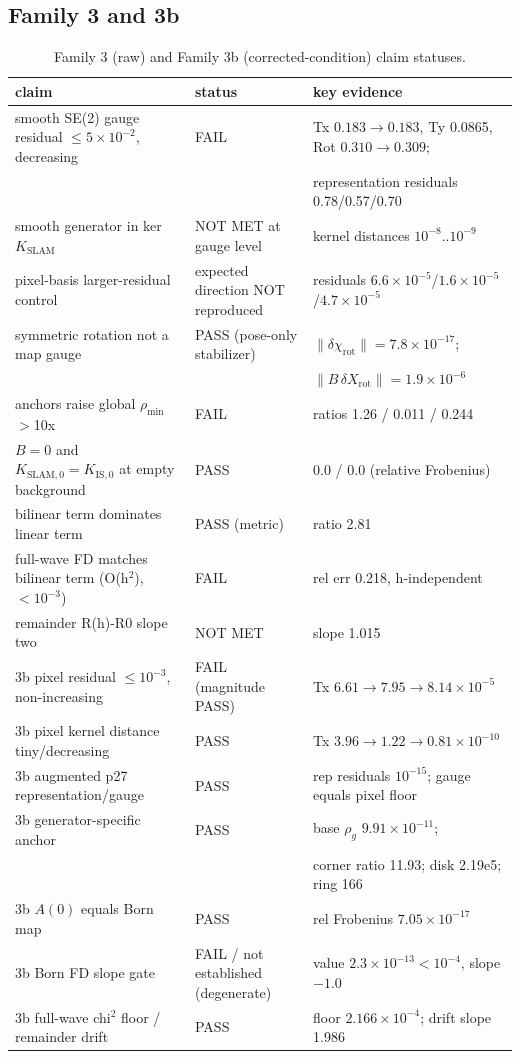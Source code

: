 \documentclass[12pt]{article}
\begin{document}
\subsection{Family 3 and 3b}
\begin{table}[ht]
\centering
\small
\caption{Family 3 (raw) and Family 3b (corrected-condition) claim statuses.}
\label{app:tab:f3}
\begin{tabular}{p{} p{} p{}}
\toprule
claim & status & key evidence \\
\midrule
smooth SE(2) gauge residual $\le5\times10^{-2}$, decreasing & FAIL &
Tx $0.183\to0.183$, Ty 0.0865, Rot $0.310\to0.309$; \\
 & & representation residuals 0.78/0.57/0.70 \\
smooth generator in ker $K_{\mathrm{SLAM}}$ & NOT MET at gauge level &
kernel distances $10^{-8}$..$10^{-9}$ \\
pixel-basis larger-residual control & expected direction NOT reproduced &
residuals $6.6\times10^{-5}$/$1.6\times10^{-5}$/$4.7\times10^{-5}$ \\
symmetric rotation not a map gauge & PASS (pose-only stabilizer) &
$\|\delta\chi_{\mathrm{rot}}\|=7.8\times10^{-17}$; \\
 & & $\|B\,\delta X_{\mathrm{rot}}\|=1.9\times10^{-6}$ \\
anchors raise global $\rho_{\min}$ $>$10x & FAIL &
ratios 1.26 / 0.011 / 0.244 \\
$B=0$ and $K_{\mathrm{SLAM},0}=K_{\mathrm{IS},0}$ at empty background &
PASS & 0.0 / 0.0 (relative Frobenius) \\
bilinear term dominates linear term & PASS (metric) & ratio 2.81 \\
full-wave FD matches bilinear term (O(h$^2$), $<10^{-3}$) & FAIL &
rel err 0.218, h-independent \\
remainder R(h)-R0 slope two & NOT MET & slope 1.015 \\
3b pixel residual $\le10^{-3}$, non-increasing & FAIL (magnitude PASS) &
Tx $6.61\to7.95\to8.14\times10^{-5}$ \\
3b pixel kernel distance tiny/decreasing & PASS &
Tx $3.96\to1.22\to0.81\times10^{-10}$ \\
3b augmented p27 representation/gauge & PASS &
rep residuals $10^{-15}$; gauge equals pixel floor \\
3b generator-specific anchor & PASS &
base $\rho_g$ $9.91\times10^{-11}$; \\
 & & corner ratio 11.93; disk 2.19e5; ring 166 \\
3b $A(0)$ equals Born map & PASS & rel Frobenius $7.05\times10^{-17}$ \\
3b Born FD slope gate & FAIL / not established (degenerate) &
value $2.3\times10^{-13}<10^{-4}$, slope $-1.0$ \\
3b full-wave chi$^2$ floor / remainder drift & PASS &
floor $2.166\times10^{-4}$; drift slope 1.986 \\
\bottomrule
\end{tabular}
\end{table}
\end{document}
